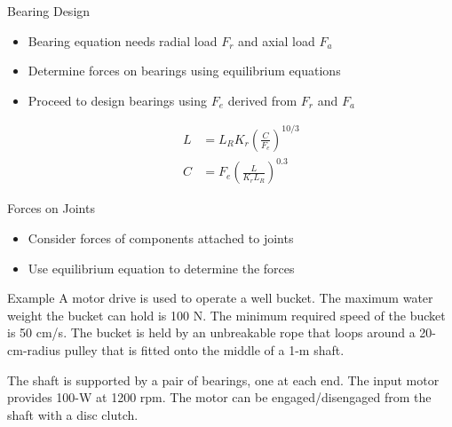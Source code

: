 \documentclass[10pt, svgnames]{beamer}
\begin{document}
\begin{frame}[label={sec:orgc91ce0e}]{Bearing Design}
\begin{itemize}
\item Bearing equation needs radial load \(F_{r}\) and axial load \(F_{a}\)

\item Determine forces on bearings using equilibrium equations

\item Proceed to design bearings using \(F_{e}\) derived from \(F_{r}\) and \(F_{a}\)

\begin{align*}
  L &= L_R K_r \left( \frac{C}{F_e} \right)^{10/3} \\
  C &= F_e \left( \frac{L}{K_r L_R} \right)^{0.3}
\end{align*}
\end{itemize}
\end{frame}

\begin{frame}[label={sec:orgf6551e6}]{Forces on Joints}
\begin{itemize}
\item Consider forces of components attached to joints

\item Use equilibrium equation to determine the forces
\end{itemize}
\end{frame}

\begin{frame}[label={sec:orgf0feb29}]{Example}
A motor drive is used to operate a well bucket. The maximum water weight the bucket can hold is 100 N. The minimum required speed of the bucket is 50 cm/s. The bucket is held by an unbreakable rope that loops around a 20-cm-radius pulley that is fitted onto the middle of a 1-m shaft.

The shaft is supported by a pair of bearings, one at each end. The input motor provides 100-W at 1200 rpm. The motor can be engaged/disengaged from the shaft with a disc clutch.

\vfill
\end{frame}
\end{document}
